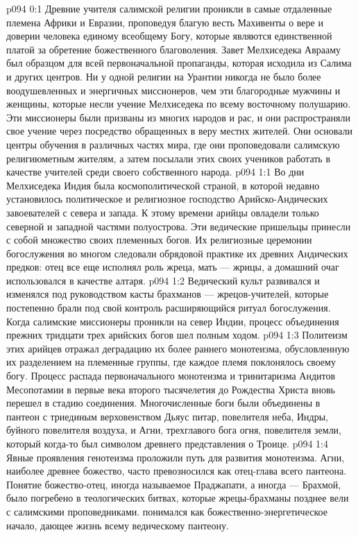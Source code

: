\vs p094 0:1 Древние учителя салимской религии проникли в самые отдаленные племена Африки и Евразии, проповедуя благую весть Махивенты о вере и доверии человека единому всеобщему Богу, которые являются единственной платой за обретение божественного благоволения. Завет Мелхиседека Аврааму был образцом для всей первоначальной пропаганды, которая исходила из Салима и других центров. Ни у одной религии на Урантии никогда не было более воодушевленных и энергичных миссионеров, чем эти благородные мужчины и женщины, которые несли учение Мелхиседека по всему восточному полушарию. Эти миссионеры были призваны из многих народов и рас, и они распространяли свое учение через посредство обращенных в веру местнх жителей. Они основали центры обучения в различных частях мира, где они проповедовали салимскую религиюметным жителям, а затем посылали этих своих учеников работать в качестве учителей среди своего собственного народа.
\vs p094 1:1 Во дни Мелхиседека Индия была космополитической страной, в которой недавно установилось политическое и религиозное господство Арийско\hyp{}Андических завоевателей с севера и запада. К этому времени арийцы овладели только северной и западной частями полуострова. Эти ведические пришельцы принесли с собой множество своих племенных богов. Их религиозные церемонии богослужения во многом следовали обрядовой практике их древних Андических предков: отец все еще исполнял роль жреца, мать --- жрицы, а домашний очаг использовался в качестве алтаря.
\vs p094 1:2 Ведический культ развивался и изменялся под руководством касты брахманов --- жрецов\hyp{}учителей, которые постепенно брали под свой контроль расширяющийся ритуал богослужения. Когда салимские миссионеры проникли на север Индии, процесс объединения прежних тридцати трех арийских богов шел полным ходом.
\vs p094 1:3 Политеизм этих арийцев отражал деградацию их более раннего монотеизма, обусловленную их разделением на племенные группы, где каждое племя поклонялось своему богу. Процесс распада первоначального монотеизма и тринитаризма Андитов Месопотамии в первые века второго тысячелетия до Рождества Христа вновь перешел в стадию соединения. Многочисленные боги были объединены в пантеон с триединым верховенством Дьяус питар, повелителя неба, Индры, буйного повелителя воздуха, и Агни, трехглавого бога огня, повелителя земли, который когда\hyp{}то был символом древнего представления о Троице.
\vs p094 1:4 Явные проявления генотеизма проложили путь для развития монотеизма. Агни, наиболее древнее божество, часто превозносился как отец\hyp{}глава всего пантеона. Понятие божество\hyp{}отец, иногда называемое Праджапати, а иногда --- Брахмой, было погребено в теологических битвах, которые жрецы\hyp{}брахманы позднее вели с салимскими проповедниками.  понимался как божественно\hyp{}энергетическое начало, дающее жизнь всему ведическому пантеону.
